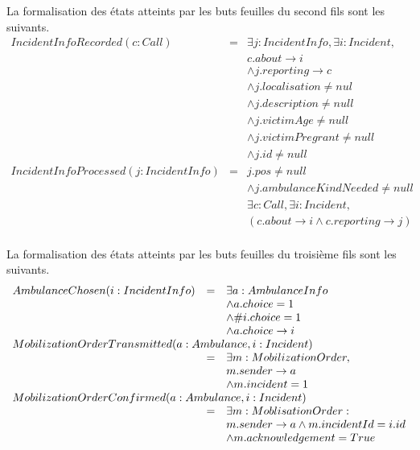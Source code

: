 	La formalisation des états atteints par les buts feuilles du second fils sont
	les suivants.
	\singlespacing
	\begin{equation*}
		\begin{array}{rcl}
			IncidentInfoRecorded(c:Call)  
			& = & \exists j:IncidentInfo, \exists i:Incident, \\
			&   & c.about \rightarrow i \\
			&   & \wedge j.reporting \rightarrow c \\
			&   & \wedge j.localisation \neq nul \\
			&   & \wedge j.description \neq null \\
			&   & \wedge j.victimAge \neq null \\
			&   & \wedge j.victimPregrant \neq null \\
			&   & \wedge j.id \neq null \\
			
			IncidentInfoProcessed(j:IncidentInfo)  
			& = & j.pos \neq null \\
			&   & \wedge j.ambulanceKindNeeded \neq null \\
			&   & \exists c:Call, \exists i:Incident, \\
			&   & (c.about \rightarrow i \wedge c.reporting \rightarrow j) \\
		\end{array}
	\end{equation*}
	\onehalfspacing
	
	La formalisation des états atteints par les buts feuilles du troisième fils sont
	les suivants.
	\singlespacing
	\begin{equation*}
		\begin{array}{rcl}
			AmbulanceChosen(i:IncidentInfo)  
			& = & \exists a:AmbulanceInfo \\
			&   & \wedge a.choice = 1 \\
			&   & \wedge \#i.choice = 1 \\
			&   & \wedge a.choice \rightarrow i \\
			
			\multicolumn{3}{l}{MobilizationOrderTransmitted(a: Ambulance, i:Incident)} \\ 
			& = & \exists m: MobilizationOrder, \\
			&   & m.sender \rightarrow a \\
			&   & \wedge m.incident = 1 \\
			
			\multicolumn{3}{l}{MobilizationOrderConfirmed(a:Ambulance, i:Incident)} \\ 
			& = & \exists m:MoblisationOrder: \\
			&   & m.sender \rightarrow a \wedge m.incidentId = i.id \\ 
			&   & \wedge m.acknowledgement = True \\
		\end{array}
	\end{equation*}
	\onehalfspacing
	
